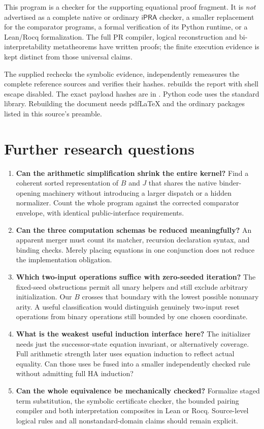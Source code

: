 \documentclass[11pt]{article}
\theoremstyle{definition}
\newcommand{\ipra}{\mathsf{iPRA}}
\newcommand{\file}[1]{\texttt{\small\detokenize{#1}}}
\begin{document}
This program is a checker for the supporting equational proof fragment.
It is \emph{not} advertised as a complete native or ordinary $\ipra$
checker, a smaller replacement for the comparator programs, a formal
verification of its Python runtime, or a Lean/Rocq formalization. The
full PR compiler, logical reconstruction and bi-interpretability
metatheorems have written proofs; the finite execution evidence is
kept distinct from those universal claims.

The supplied \file{reproduce.py} rechecks the symbolic evidence,
independently remeasures the complete reference sources and verifies
their hashes. \file{build.py} rebuilds the report with shell escape
disabled. The exact payload hashes are in \file{MANIFEST.json}.
Python code uses the standard library. Rebuilding the document needs
pdfLaTeX and the ordinary packages listed in this source's preamble.

\section{Further research questions}

\begin{enumerate}[leftmargin=*,itemsep=5pt]
\item \textbf{Can the arithmetic simplification shrink the entire kernel?}
  Find a coherent sorted representation of $B$ and $J$ that shares the
  native binder-opening machinery without introducing a larger dispatch
  or a hidden normalizer. Count the whole program against the corrected
  comparator envelope, with identical public-interface requirements.
\item \textbf{Can the three computation schemas be reduced meaningfully?}
  An apparent merger must count its matcher, recursion declaration
  syntax, and binding checks. Merely placing equations in one conjunction
  does not reduce the implementation obligation.
\item \textbf{Which two-input operations suffice with zero-seeded iteration?}
  The fixed-seed obstructions permit all unary helpers and still exclude
  arbitrary initialization. Our $B$ crosses that boundary with the lowest
  possible nonunary arity. A useful classification would distinguish
  genuinely two-input reset operations from binary operations still
  bounded by one chosen coordinate.
\item \textbf{What is the weakest useful induction interface here?}
  The initializer needs just the successor-state equation invariant, or
  alternatively coverage. Full arithmetic strength later uses equation
  induction to reflect actual equality. Can those uses be fused into a
  smaller independently checked rule without admitting full HA induction?
\item \textbf{Can the whole equivalence be mechanically checked?}
  Formalize staged term substitution, the symbolic certificate checker,
  the bounded pairing compiler and both interpretation composites in
  Lean or Rocq. Source-level logical rules and all nonstandard-domain
  claims should remain explicit.
\end{enumerate}
\end{document}
